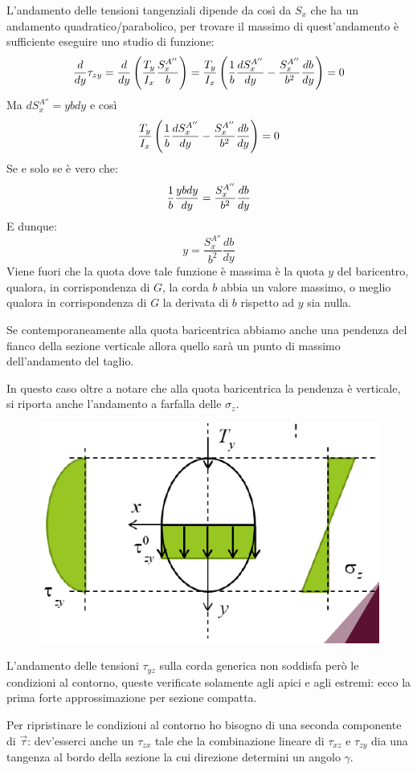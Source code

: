 		L'andamento delle tensioni tangenziali dipende da così da $S_x$ che ha un andamento quadratico/parabolico, per trovare il massimo di quest'andamento è sufficiente eseguire uno studio di funzione: 
		\[ {d\over dy}\tau_{zy} = {d\over dy}\left(\dfrac{T_y}{I_x}\dfrac{S_x^{A''}}{b}\right) = \dfrac{T_y}{I_x}\left( {1\over b}\dfrac{dS_x^{A''}}{dy} - \dfrac{S_x^{A''}}{b^2}\dfrac{db}{dy}\right) = 0\]
		Ma \( dS_x^{A''} = ybdy\) e così
		\[ \dfrac{T_y}{I_x}\left( {1\over b}\dfrac{dS_x^{A''}}{dy} - \dfrac{S_x^{A''}}{b^2}\dfrac{db}{dy}\right) = 0 \]
		Se e solo se è vero che:
		\[{1\over b}\dfrac{ybdy}{dy} = \dfrac{S_x^{A''}}{b^2}\dfrac{db}{dy}\]
		E dunque: 
		\[ y =  \dfrac{S_x^{A''}}{b^2}\dfrac{db}{dy}\]
		Viene fuori che la quota dove tale funzione è massima è la quota $y$ del baricentro, qualora, in corrispondenza di $G$, la corda $b$ abbia un valore massimo, o meglio qualora in corrispondenza di $G$ la derivata di $b$ rispetto ad $y$ sia nulla. 
		
		Se contemporaneamente alla quota baricentrica abbiamo anche una pendenza del fianco della sezione verticale allora quello sarà un punto di massimo dell'andamento del taglio. \newline 
		
		In questo caso oltre a notare che alla quota baricentrica la pendenza è verticale, si riporta anche l'andamento a farfalla delle $\sigma_z$. 
		
\begin{figure}[H]
	\centering
	\label{fig:screenshot007}
	\includegraphics[width=0.45\linewidth]{immagini_6/screenshot007}
\end{figure}

		L'andamento delle tensioni $\tau_{yz}$ sulla corda generica non soddisfa però le condizioni al contorno, queste verificate solamente agli apici e agli estremi: ecco la prima forte approssimazione per sezione compatta. \newline 
		
		Per ripristinare le condizioni al contorno ho bisogno di una seconda componente di $\vec{\tau}$: dev'esserci anche un $\tau_{zx}$ tale che la combinazione lineare di $\tau_{xz}$ e $\tau_{zy}$ dia una tangenza al bordo della sezione la cui direzione determini un angolo $\gamma$. \newline
		
